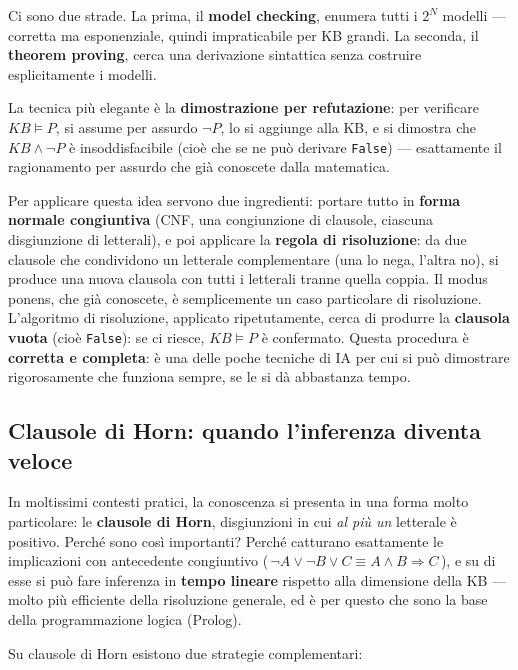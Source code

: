 \documentclass[11pt,a4paper]{article}
\begin{document}
Ci sono due strade. La prima, il \textbf{model checking}, enumera tutti i $2^N$ modelli --- corretta ma esponenziale, quindi impraticabile per KB grandi. La seconda, il \textbf{theorem proving}, cerca una derivazione sintattica senza costruire esplicitamente i modelli.

La tecnica più elegante è la \textbf{dimostrazione per refutazione}: per verificare $KB \models P$, si assume per assurdo $\neg P$, lo si aggiunge alla KB, e si dimostra che $KB \wedge \neg P$ è insoddisfacibile (cioè che se ne può derivare \texttt{False}) --- esattamente il ragionamento per assurdo che già conoscete dalla matematica.

Per applicare questa idea servono due ingredienti: portare tutto in \textbf{forma normale congiuntiva} (CNF, una congiunzione di clausole, ciascuna disgiunzione di letterali), e poi applicare la \textbf{regola di risoluzione}: da due clausole che condividono un letterale complementare (una lo nega, l'altra no), si produce una nuova clausola con tutti i letterali tranne quella coppia. Il modus ponens, che già conoscete, è semplicemente un caso particolare di risoluzione. L'algoritmo di risoluzione, applicato ripetutamente, cerca di produrre la \textbf{clausola vuota} (cioè \texttt{False}): se ci riesce, $KB \models P$ è confermato. Questa procedura è \textbf{corretta e completa}: è una delle poche tecniche di IA per cui si può dimostrare rigorosamente che funziona sempre, se le si dà abbastanza tempo.

\subsection{Clausole di Horn: quando l'inferenza diventa veloce}

In moltissimi contesti pratici, la conoscenza si presenta in una forma molto particolare: le \textbf{clausole di Horn}, disgiunzioni in cui \emph{al più un} letterale è positivo. Perché sono così importanti? Perché catturano esattamente le implicazioni con antecedente congiuntivo (\,$\neg A \vee \neg B \vee C \equiv A \wedge B \Rightarrow C$\,), e su di esse si può fare inferenza in \textbf{tempo lineare} rispetto alla dimensione della KB --- molto più efficiente della risoluzione generale, ed è per questo che sono la base della programmazione logica (Prolog).

Su clausole di Horn esistono due strategie complementari:
\end{document}
